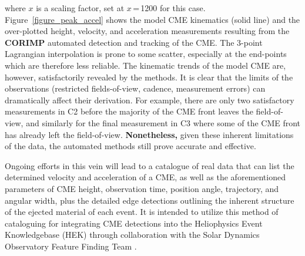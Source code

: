 \documentclass[preprint2]{aastex}
\begin{document}
where $x$ is a scaling factor, set at $x$\,=\,1200 for this case. Figure~\ref{figure_peak_accel} shows the model CME kinematics (solid line) and the over-plotted height, velocity, and acceleration measurements resulting from the {\bf CORIMP} automated detection and tracking of the CME. The 3-point Lagrangian interpolation is prone to some scatter, especially at the end-points which are therefore less reliable. The kinematic trends of the model CME are, however, satisfactorily revealed by the methods. It is clear that the limits of the observations (restricted fields-of-view, cadence, measurement errors) can dramatically affect their derivation. For example, there are only two satisfactory measurements in C2 before the majority of the CME front leaves the field-of-view, and similarly for the final measurement in C3 where some of the CME front has already left the field-of-view. {\bf Nonetheless,} given these inherent limitations of the data, the automated methods still prove accurate and effective. 

Ongoing efforts in this vein will lead to a catalogue of real data that can list the determined velocity and acceleration of a CME, as well as the aforementioned parameters of CME height, observation time, position angle, trajectory, and angular width, plus the detailed edge detections outlining the inherent structure of the ejected material of each event. It is intended to utilize this method of cataloguing for integrating CME detections into the Heliophysics Event Knowledgebase (HEK) through collaboration with the Solar Dynamics Observatory Feature Finding Team \citep[SDO FFT;][]{2011SoPh..tmp..144M}.
\end{document}
